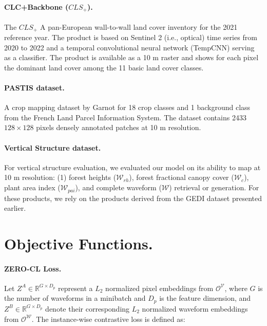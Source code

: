 \paragraph{CLC+Backbone ($CLS_+$).}The $CLS_+$ A pan-European wall-to-wall land cover inventory for the 2021 reference year. The product is based on Sentinel 2 (i.e., optical) time series from 2020 to 2022 and a temporal convolutional neural network (TempCNN) \cite{Pelletier2019} serving as a classifier. The product is available as a 10 m raster and shows for each pixel the dominant land cover among the 11 basic land cover classes.

\paragraph{PASTIS dataset.}A crop mapping dataset by Garnot  for 18 crop classes and 1 background class from the French Land Parcel Information System. The dataset contains 2433 $128 \times 128$ pixels densely annotated patches at 10 m resolution.

\paragraph{Vertical Structure dataset.}For vertical structure evaluation, we evaluated our model on its ability to map at 10 m resolution: (1) forest heights ($\mathcal{W}_{rh}$), forest fractional canopy cover ($\mathcal{W}_c$), plant area index ($\mathcal{W}_{pai}$), and complete waveform ($\mathcal{W}$) retrieval or generation. For these products, we rely on the products derived from the GEDI dataset presented earlier.

\section{Objective Functions.} \label{appendix:objective_functions}

\paragraph{ZERO-CL Loss.}
Let \( Z^A \in \mathbb{R}^{G\times D_p} \) represent a $L_2$ normalized pixel embeddings from $\mathcal{O}^\mathcal{V}$, where \( G \) is the number of waveforms in a minibatch and \(D_p \) is the feature dimension, and \( Z^B \in \mathbb{R}^{G \times D_p} \) denote their corresponding $L_2$ normalized waveform embeddings from $\mathcal{O}^\mathcal{W}$. The instance-wise contrastive loss is defined as:

